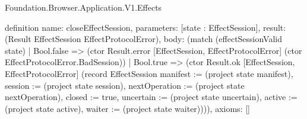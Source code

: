 \begin{lexlean}{Foundation.Browser.Application.V1.Effects}
\begin{semanticmodule}
definition{
  name: closeEffectSession,
  parameters: [state : EffectSession],
  result: (Result EffectSession EffectProtocolError),
  body: (match (effectSessionValid state)
    | Bool.false => (ctor Result.error [EffectSession, EffectProtocolError] (ctor EffectProtocolError.BadSession))
    | Bool.true => (ctor Result.ok [EffectSession, EffectProtocolError] (record EffectSession {manifest := (project state manifest), session := (project state session), nextOperation := (project state nextOperation), closed := true, uncertain := (project state uncertain), active := (project state active), waiter := (project state waiter)}))),
  axioms: []
}
\end{semanticmodule}
\end{lexlean}
